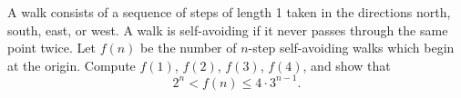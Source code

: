 A walk consists of a sequence of steps of length 1 taken in the directions north, south, east, or west.  A walk is self-avoiding if it never passes through the same point twice.  Let $f(n)$ be the number of $n$-step self-avoiding walks which begin at the origin.  Compute $f(1)$,  $f(2)$,  $f(3)$,  $f(4)$,  and show that\[2^n < f(n) \le 4 \cdot 3^{n - 1}.\]